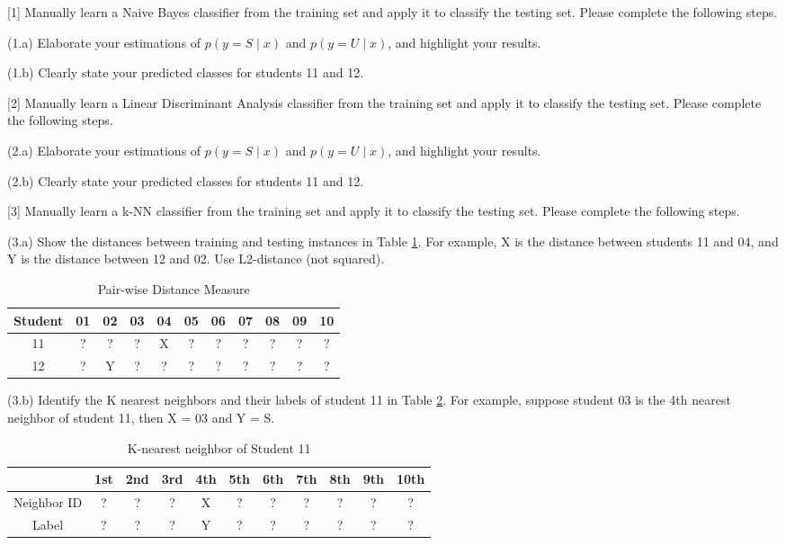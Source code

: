 \documentclass{llncs}
\begin{document}
\newpage 

[1] Manually learn a Naive Bayes classifier from 
the training set and apply it to classify the 
testing set. Please complete the following steps. 

(1.a) Elaborate your estimations of $p(y = S\mid x)$  
and $p(y = U\mid x)$, and highlight your results. 

(1.b) Clearly state your predicted classes for 
students 11 and 12. 

\newpage 

[2] Manually learn a Linear Discriminant Analysis 
classifier from the training set and apply it to 
classify the testing set. Please complete the following 
steps. 

(2.a) Elaborate your estimations of $p(y = S\mid x)$  
and $p(y = U\mid x)$, and highlight your results. 

(2.b) Clearly state your predicted classes for 
students 11 and 12. 

\newpage 

[3] Manually learn a k-NN classifier from the training 
set and apply it to classify the testing set. Please 
complete the following steps. 

(3.a) Show the distances between training 
and testing instances in Table \ref{tab:hw11_tab3}. 
For example, X is the distance between students 11 
and 04, and Y is the distance between 12 and 02. 
Use L2-distance (not squared). 

\begin{table}
\caption{Pair-wise Distance Measure}
\centering
\setlength{\tabcolsep}{10pt} %
\def\arraystretch{2} %
\begin{tabular}{c|c|c|c|c|c|c|c|c|c|c} \hline 
Student & 01 & 02 & 03 & 04 & 05 
& 06 & 07 & 08 & 09 & 10 \\ \hline 
11 & ? & ? & ? & X & ? & ? & ? & ? & ? & ? \\ \hline
12 & ? & Y & ? & ? & ? & ? & ? & ? & ? & ? \\ \hline 
\end{tabular}
\label{tab:hw11_tab3}
\end{table}

(3.b) Identify the K nearest neighbors and their 
labels of student 11 in Table \ref{tab:hw11_tab4}. 
For example, suppose student 03 is the 4th nearest 
neighbor of student 11, then X = 03 and Y = S. 

\begin{table}
\caption{K-nearest neighbor of Student 11}
\centering
\setlength{\tabcolsep}{10pt} %
\def\arraystretch{2} %
\begin{tabular}{c|c|c|c|c|c|c|c|c|c|c} \hline 
 & 1st & 2nd & 3rd & 4th & 5th 
& 6th & 7th & 8th & 9th & 10th \\ \hline
Neighbor ID & ? & ? & ? & X & ? & ? & ? & ? & ? & ? \\ \hline
Label & ? & ? & ? & Y & ? & ? & ? & ? & ? & ? \\ \hline
\end{tabular}
\label{tab:hw11_tab4}
\end{table}
\end{document}
